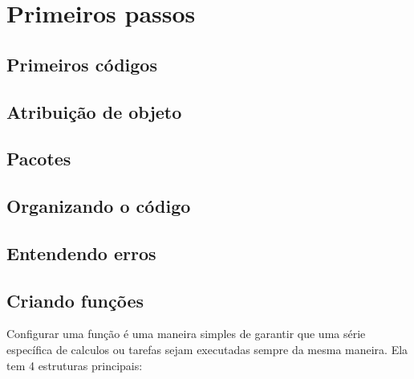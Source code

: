 \documentclass[
]{book}
\begin{document}
\hypertarget{primeiros}{%
\chapter{Primeiros passos}\label{primeiros}}

\hypertarget{primeiros-cuxf3digos}{%
\section{Primeiros códigos}\label{primeiros-cuxf3digos}}

\hypertarget{atribuiuxe7uxe3o-de-objeto}{%
\section{Atribuição de objeto}\label{atribuiuxe7uxe3o-de-objeto}}

\hypertarget{pacotes}{%
\section{Pacotes}\label{pacotes}}

\hypertarget{organizando-o-cuxf3digo}{%
\section{Organizando o código}\label{organizando-o-cuxf3digo}}

\hypertarget{entendendo-erros}{%
\section{Entendendo erros}\label{entendendo-erros}}

\hypertarget{criando-funuxe7uxf5es}{%
\section{Criando funções}\label{criando-funuxe7uxf5es}}

Configurar uma função é uma maneira simples de garantir que uma série específica de calculos ou tarefas sejam executadas sempre da mesma maneira. Ela tem 4 estruturas principais:
\end{document}
